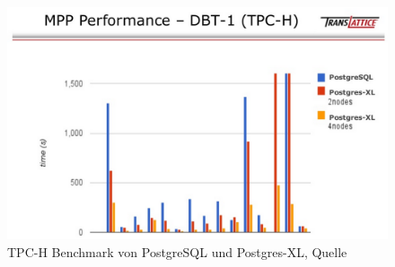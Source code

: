 \begin{figure}[h!]
\centering
\includegraphics[width=.8\textwidth]{Abbildungen/postgresxl_versus_postgis.png}
\caption[TPC-H Benchmark von PostgreSQL und Postgres-XL]{TPC-H Benchmark von PostgreSQL und Postgres-XL, Quelle \cite[S.12]{website:slideshare:pgxc}}
\label{fig:pgxcversuspgsql}
\end{figure}

